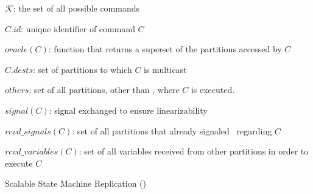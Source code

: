 \begin{algorithm}[h!]
\begin{distribalgo}[1]
$\mathcal{K}$: the set of all possible commands

\vspace{1mm}

$C.id$: unique identifier of command $C$

\vspace{1mm}

$oracle(C)$: function that returns a superset of the partitions accessed by $C$

\vspace{1mm}

$C.dests$: set of partitions to which $C$ is multicast

\vspace{1mm}

$others$: set of all partitions, other than \pp{}, where $C$ is executed.

\vspace{1mm}

$signal(C)$: signal exchanged to ensure linearizability

\vspace{1mm}

$rcvd\_signals(C)$: set of all partitions that already signaled \pp\ regarding $C$

\vspace{1mm}

$rcvd\_variables(C)$: set of all variables received from other partitions in order to execute $C$

\caption{Scalable State Machine Replication (\ssmr)}
\label{alg:ssmr}
\end{distribalgo}
\end{algorithm}